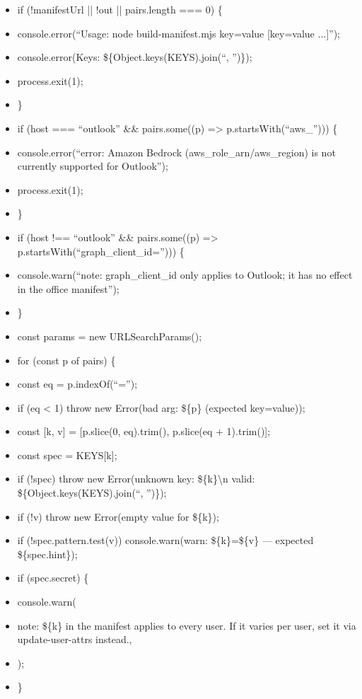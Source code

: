 \documentclass[11pt]{article}
\begin{document}
\begin{itemize}[leftmargin=*,itemsep=2pt,topsep=2pt]
\item {} if (!manifestUrl || !out || pairs.length === 0) \{
\item {} console.error(``Usage: node build-manifest.mjs key=value [key=value ...]'');
\item {} console.error(Keys: \$\{Object.keys(KEYS).join(``, '')\});
\item {} process.exit(1);
\item {} \}
\item {} if (host === ``outlook'' \&\& pairs.some((p) => p.startsWith(``aws\_\allowbreak{}''))) \{
\item {} console.error(``error: Amazon Bedrock (aws\_\allowbreak{}role\_\allowbreak{}arn/aws\_\allowbreak{}region) is not currently supported for Outlook'');
\item {} process.exit(1);
\item {} \}
\item {} if (host !== ``outlook'' \&\& pairs.some((p) => p.startsWith(``graph\_\allowbreak{}client\_\allowbreak{}id=''))) \{
\item {} console.warn(``note: graph\_\allowbreak{}client\_\allowbreak{}id only applies to Outlook; it has no effect in the office manifest'');
\item {} \}
\item {} const params = new URLSearchParams();
\item {} for (const p of pairs) \{
\item {} const eq = p.indexOf(``='');
\item {} if (eq < 1) throw new Error(bad arg: \$\{p\} (expected key=value));
\item {} const [k, v] = [p.slice(0, eq).trim(), p.slice(eq + 1).trim()];
\item {} const spec = KEYS[k];
\item {} if (!spec) throw new Error(unknown key: \$\{k\}\textbackslash{}n valid: \$\{Object.keys(KEYS).join(``, '')\});
\item {} if (!v) throw new Error(empty value for \$\{k\});
\item {} if (!spec.pattern.test(v)) console.warn(warn: \$\{k\}=\$\{v\} — expected \$\{spec.hint\});
\item {} if (spec.secret) \{
\item {} console.warn(
\item {} note: \$\{k\} in the manifest applies to every user. If it varies per user, set it via update-user-attrs instead.,
\item {} );
\item {} \}

\end{itemize}
\end{document}
